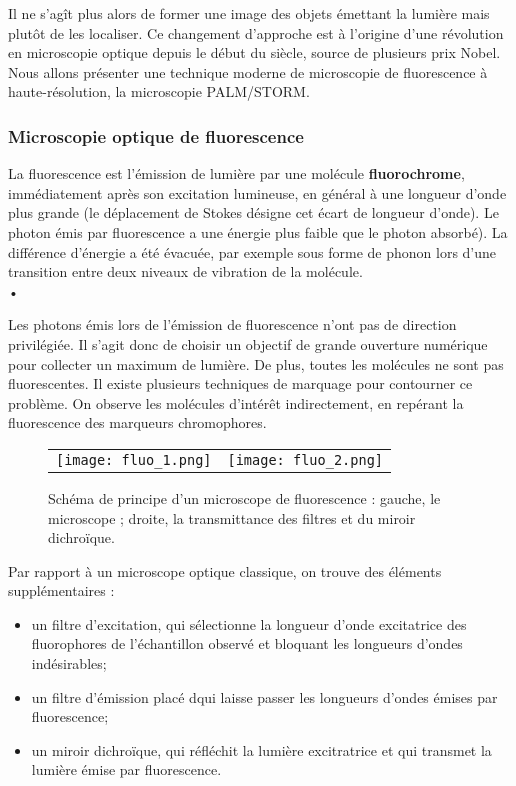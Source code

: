 \documentclass[11pt,a4paper]{report}
\begin{document}
Il ne s'agît plus alors de former une image des objets émettant la lumière mais plutôt de les localiser. Ce changement d'approche est à l'origine d'une révolution en microscopie optique depuis le début du siècle, source de plusieurs prix Nobel. Nous allons présenter une technique moderne de microscopie de fluorescence à haute-résolution, la microscopie PALM/STORM.

\subsubsection{Microscopie optique de fluorescence}

La fluorescence est l'émission de lumière par une molécule \textbf{fluorochrome}, immédiatement après son excitation lumineuse, en général à une longueur d'onde plus grande (le déplacement de Stokes désigne cet écart de longueur d'onde). Le photon émis par fluorescence a une énergie plus faible que le photon absorbé). La différence d'énergie a été évacuée, par exemple sous forme de phonon lors d'une transition entre deux niveaux de vibration de la molécule.\\•

Les photons émis lors de l'émission de fluorescence n'ont pas de direction privilégiée. Il s'agit donc de choisir un objectif de grande ouverture numérique pour collecter un maximum de lumière. De plus, toutes les molécules ne sont pas fluorescentes. Il existe plusieurs techniques de marquage pour contourner ce problème. On observe les molécules d'intérêt indirectement, en repérant la fluorescence des marqueurs chromophores.

\begin{figure}[h!]
	\begin{center}
	\begin{tabular}{cc}
		\texttt{[image: fluo\_1.png]} &
		\texttt{[image: fluo\_2.png]}\\
	\end{tabular}
	\end{center}
	\caption{Schéma de principe d'un microscope de fluorescence : gauche, le microscope ; droite, la 		transmittance des filtres et du miroir dichroïque.}
\end{figure}

Par rapport à un microscope optique classique, on trouve des éléments supplémentaires :
\begin{itemize}
	\item un filtre d'excitation, qui sélectionne la longueur d'onde excitatrice des fluorophores de 			l'échantillon observé et bloquant les longueurs d'ondes indésirables;
	\item un filtre d'émission placé dqui laisse passer les longueurs d'ondes émises par fluorescence;
	\item un miroir dichroïque, qui réfléchit la lumière excitratrice et qui transmet la lumière émise 		par fluorescence.
\end{itemize}
\end{document}
